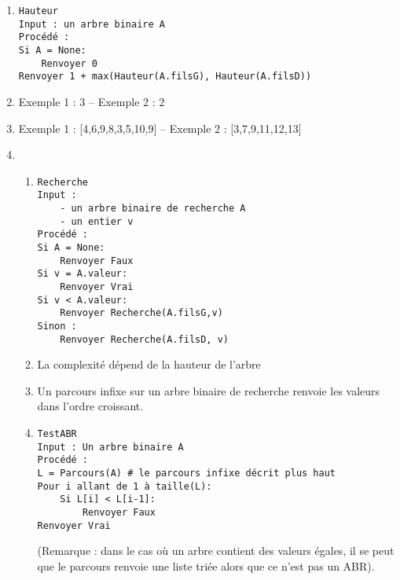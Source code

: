 \begin{exercice}
\begin{enumerate}
\item 

\begin{lstlisting}
Hauteur
Input : un arbre binaire A
Procédé :
Si A = None: 
    Renvoyer 0
Renvoyer 1 + max(Hauteur(A.filsG), Hauteur(A.filsD))
\end{lstlisting}

\item Exemple 1 :  3 -- Exemple 2 : 2

\item Exemple 1 : [4,6,9,8,3,5,10,9] -- Exemple 2 : [3,7,9,11,12,13]

\item \begin{enumerate}

\item 

\begin{lstlisting}
Recherche
Input : 
    - un arbre binaire de recherche A
    - un entier v
Procédé :
Si A = None:
    Renvoyer Faux
Si v = A.valeur:
    Renvoyer Vrai
Si v < A.valeur:
    Renvoyer Recherche(A.filsG,v)
Sinon :
    Renvoyer Recherche(A.filsD, v)
\end{lstlisting}

\item La complexité dépend de la hauteur de l'arbre

\item Un parcours infixe sur un arbre binaire de recherche renvoie les valeurs dans l'ordre croissant.

\item 

\begin{lstlisting}
TestABR
Input : Un arbre binaire A
Procédé :
L = Parcours(A) # le parcours infixe décrit plus haut
Pour i allant de 1 à taille(L):
    Si L[i] < L[i-1]:
        Renvoyer Faux
Renvoyer Vrai
\end{lstlisting}

(Remarque : dans le cas où un arbre contient des valeurs égales, il se peut que le parcours renvoie une liste triée alors que ce n'est pas un ABR).

\end{enumerate}

\end{enumerate}



\end{exercice}